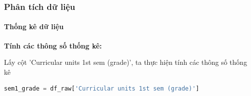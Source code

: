 \subsubsection{Phân tích dữ liệu}
    \paragraph{Thống kê dữ liệu}
    \leavevmode

    \hypertarget{line:stat-example}{\textbf{Tính các thông số thống kê:}}

    Lấy cột 'Curricular units 1st sem (grade)', ta thực hiện tính các thông số thống kê

    \begin{lstlisting}[language=Python]
        sem1_grade = df_raw['Curricular units 1st sem (grade)']
    \end{lstlisting}
    
